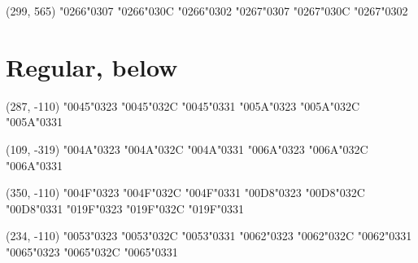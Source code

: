 (299, 565) \char"0266\cgj\char"0307 \char"0266\cgj\char"030C \char"0266\cgj\char"0302 \char"0267\cgj\char"0307 \char"0267\cgj\char"030C \char"0267\cgj\char"0302


\section*{Regular, below}

(287, -110) \char"0045\cgj\char"0323 \char"0045\cgj\char"032C \char"0045\cgj\char"0331 \char"005A\cgj\char"0323 \char"005A\cgj\char"032C \char"005A\cgj\char"0331

(109, -319) \char"004A\cgj\char"0323 \char"004A\cgj\char"032C \char"004A\cgj\char"0331 \char"006A\cgj\char"0323 \char"006A\cgj\char"032C \char"006A\cgj\char"0331

(350, -110) \char"004F\cgj\char"0323 \char"004F\cgj\char"032C \char"004F\cgj\char"0331 \char"00D8\cgj\char"0323 \char"00D8\cgj\char"032C \char"00D8\cgj\char"0331 \char"019F\cgj\char"0323 \char"019F\cgj\char"032C \char"019F\cgj\char"0331

(234, -110) \char"0053\cgj\char"0323 \char"0053\cgj\char"032C \char"0053\cgj\char"0331 \char"0062\cgj\char"0323 \char"0062\cgj\char"032C \char"0062\cgj\char"0331 \char"0065\cgj\char"0323 \char"0065\cgj\char"032C \char"0065\cgj\char"0331

